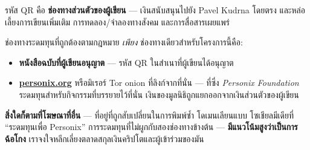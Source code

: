 \begin{minipage}[t]{0.60\textwidth}
\vspace{0pt}
\begin{mdframed}[
  linewidth=0.7pt,roundcorner=5pt,
  innerleftmargin=10pt,innerrightmargin=10pt,
  innertopmargin=8pt,innerbottommargin=8pt,
  skipabove=0pt,skipbelow=0pt,
  linecolor=cbwarning!50,backgroundcolor=cbwarning!5,
  nobreak=true,
  needspace=4\baselineskip,
]
\footnotesize
รหัส QR คือ \textbf{ช่องทางส่วนตัวของผู้เขียน} --- เงินสนับสนุนไปยัง Pavel Kudrna โดยตรง และหล่อเลี้ยงการเขียนเพิ่มเติม การทดลอง/จำลองทางสังคม และการสื่อสารเผยแพร่

\smallskip
ช่องทางระดมทุนที่ถูกต้องตามกฎหมาย \emph{เพียง} ช่องทางเดียวสำหรับโครงการนี้คือ:

\smallskip
\begin{itemize}
\setlength{\itemsep}{0pt}
\setlength{\topsep}{0pt}
\item \textbf{หนังสือฉบับที่ผู้เขียนอนุญาต} --- รหัส QR ในสำเนาที่ผู้เขียนได้อนุญาต
\item \href{https://personix.org}{\textbf{personix.org}} หรือมิเรอร์ Tor onion ที่ลิงก์จากที่นั่น --- ที่ซึ่ง \emph{Personix Foundation} ระดมทุนสำหรับกิจกรรมที่บรรยายไว้ที่นั่น เงินของมูลนิธิถูกแยกออกจากเงินส่วนตัวของผู้เขียน
\end{itemize}

\smallskip
\textbf{สิ่งใดก็ตามที่โฆษณาที่อื่น} --- ที่อยู่ที่ถูกสับเปลี่ยนในการพิมพ์ซ้ำ โดเมนเลียนแบบ โซเชียลมีเดียที่ ``ระดมทุนเพื่อ Personix'' การระดมทุนที่ไม่ผูกกับสองช่องทางข้างต้น --- \textbf{มีแนวโน้มสูงว่าเป็นการฉ้อโกง} เราจงใจหลีกเลี่ยงตลาดสกุลเงินคริปโตและผู้เข้าร่วมของมัน
\end{mdframed}
\end{minipage}

\clearpage
